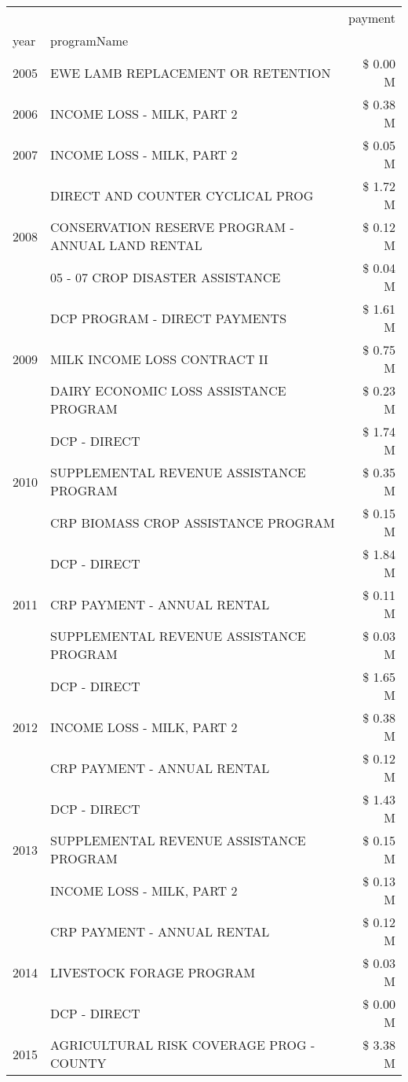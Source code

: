 \begin{tabular}{llr}
\toprule
 &  & payment \\
year & programName &  \\
\midrule
2005 & EWE LAMB REPLACEMENT OR RETENTION & \$ 0.00 M \\
\cline{1-3}
2006 & INCOME LOSS - MILK, PART 2 & \$ 0.38 M \\
\cline{1-3}
2007 & INCOME LOSS - MILK, PART 2 & \$ 0.05 M \\
\cline{1-3}
\multirow[t]{3}{*}{2008} & DIRECT AND COUNTER CYCLICAL PROG & \$ 1.72 M \\
 & CONSERVATION RESERVE PROGRAM - ANNUAL LAND RENTAL & \$ 0.12 M \\
 & 05 - 07 CROP DISASTER ASSISTANCE & \$ 0.04 M \\
\cline{1-3}
\multirow[t]{3}{*}{2009} & DCP PROGRAM - DIRECT PAYMENTS & \$ 1.61 M \\
 & MILK INCOME LOSS CONTRACT II & \$ 0.75 M \\
 & DAIRY ECONOMIC LOSS ASSISTANCE PROGRAM & \$ 0.23 M \\
\cline{1-3}
\multirow[t]{3}{*}{2010} & DCP - DIRECT & \$ 1.74 M \\
 & SUPPLEMENTAL REVENUE ASSISTANCE PROGRAM & \$ 0.35 M \\
 & CRP BIOMASS CROP ASSISTANCE PROGRAM & \$ 0.15 M \\
\cline{1-3}
\multirow[t]{3}{*}{2011} & DCP - DIRECT & \$ 1.84 M \\
 & CRP PAYMENT - ANNUAL RENTAL & \$ 0.11 M \\
 & SUPPLEMENTAL REVENUE ASSISTANCE PROGRAM & \$ 0.03 M \\
\cline{1-3}
\multirow[t]{3}{*}{2012} & DCP - DIRECT & \$ 1.65 M \\
 & INCOME LOSS - MILK, PART 2 & \$ 0.38 M \\
 & CRP PAYMENT - ANNUAL RENTAL & \$ 0.12 M \\
\cline{1-3}
\multirow[t]{3}{*}{2013} & DCP - DIRECT & \$ 1.43 M \\
 & SUPPLEMENTAL REVENUE ASSISTANCE PROGRAM & \$ 0.15 M \\
 & INCOME LOSS - MILK, PART 2 & \$ 0.13 M \\
\cline{1-3}
\multirow[t]{3}{*}{2014} & CRP PAYMENT - ANNUAL RENTAL & \$ 0.12 M \\
 & LIVESTOCK FORAGE PROGRAM & \$ 0.03 M \\
 & DCP - DIRECT & \$ 0.00 M \\
\cline{1-3}
\multirow[t]{2}{*}{2015} & AGRICULTURAL RISK COVERAGE PROG - COUNTY & \$ 3.38 M \\

\end{tabular}
